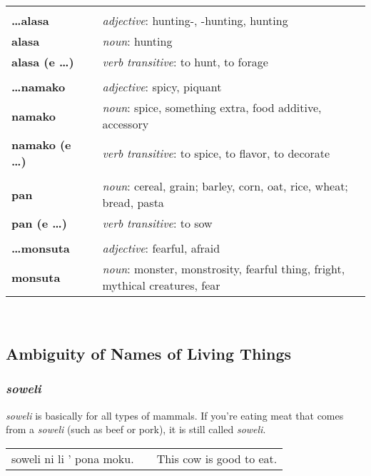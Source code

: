 \begin{supertabular}{p{2,5cm}|ll}
 && \\ %
\textbf{\dots alasa} && \textit{adjective}: hunting-, -hunting, hunting \\ %
\textbf{alasa} && \textit{noun}: hunting \\ %
\textbf{alasa (e \dots)} && \textit{verb transitive}: to hunt, to forage \\ %
 && \\ %
\textbf{\dots namako} && \textit{adjective}: spicy, piquant \\ 
\textbf{namako} && \textit{noun}: spice, something extra, food additive, accessory \\ %
\textbf{namako (e \dots)} && \textit{verb transitive}: to spice, to flavor, to decorate \\ %
 && \\ %
\textbf{pan} && \textit{noun}: cereal, grain; barley, corn, oat, rice, wheat; bread, pasta \\ %
\textbf{pan (e \dots)} && \textit{verb transitive}: to sow \\ %
 && \\ %
\textbf{\dots monsuta} && \textit{adjective}: fearful, afraid \\ %
\textbf{monsuta} && \textit{noun}: monster, monstrosity, fearful thing, fright, mythical creatures, fear \\ %
\end{supertabular} \\
%
\subsection*{Ambiguity of Names of Living Things}
\subsubsection*{\textit{soweli}}
%
\textit{soweli} is basically for all types of mammals. 
If you're eating meat that comes from a \textit{soweli} (such as beef or pork), it is still called \textit{soweli}. 

\begin{supertabular}{p{5,5cm}|ll}
soweli ni li ' pona moku. && This cow is good to eat. \\
\end{supertabular} 
%
